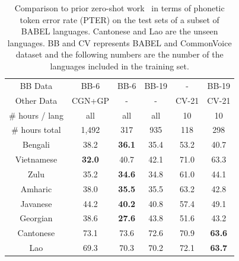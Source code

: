 \begin{table}[t]
\begin{center}
\caption{Comparison to prior zero-shot work~\cite{gaozero} in terms of phonetic token error rate (PTER) on the test sets of a subset of BABEL languages. Cantonese and Lao are the unseen languages. BB and CV represents BABEL and CommonVoice dataset and the following numbers are the number of the languages included in the training set.\label{tab:gao_res_full}
}
\setlength{\tabcolsep}{3pt}
\begin{tabular}{@{}cccccc@{}}
\toprule
BB Data          & BB-6\cite{gaozero} & BB-6 & BB-19 & - & BB-19 \\
Other Data       & CGN+GP & - & - & CV-21 & CV-21 \\
\# hours / lang &        all              &       all           &        all           & 10             & 10                        \\
\# hours total               & 1,492                & 317              & 935               & 118            & 298                       \\
\midrule
Bengali                   & 38.2                 & \textbf{36.1}    & 35.4              & 53.2           & 40.7                      \\
Vietnamese                & \textbf{32.0}        & 40.7             & 42.1              & 71.0           & 63.3                      \\
Zulu                      & 35.2                 & \textbf{34.6}    & 34.8              & 61.0           & 44.1                      \\
Amharic                   & 38.0                 & \textbf{35.5}    & 35.5              & 63.2           & 42.8                      \\
Javanese                  & 44.2                 & \textbf{40.2}    & 40.8              & 57.4           & 49.1                      \\
Georgian                  & 38.6                 & \textbf{27.6}    & 43.8              & 51.6           & 43.2                      \\
\midrule
Cantonese                 & 73.1                 & 73.6             & 72.6              & 70.9           & \textbf{63.6}             \\
Lao                       & 69.3                 & 70.3             & 70.2              & 72.1           & \textbf{63.7}    \\ 
\bottomrule         
\end{tabular}


\end{center}
\end{table}
